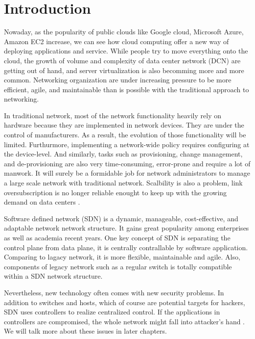\chapter{Introduction}
\label{chap:intro}
\setcounter{page}{1}

Nowaday, as the popularity of public clouds like Google cloud, Microsoft Azure, Amazon EC2 increase, we can see how cloud computing offer a new way of deploying applications and service. While people try to move everything onto the cloud, the growth of volume and complexity of data center network (DCN) are getting out of hand, and server virtualization is also becomming more and more common. Networking organization are under increasing pressure to be more efficient, agile, and maintainable than is possible with the traditional approach to networking.

In traditional network, most of the network functionality heavily rely on hardware because they are implemented in network devices. They are under the control of manufacturers. As a result, the evolution of those functionality will be limited. Furthurmore, implementing a network-wide policy requires configuring at the device-level. And similarly, tasks such as provisioning, change management, and de-provisioning are also very time-consuming, error-prone and require a lot of manwork. It will surely be a formidable job for network administrators to manage a large scale network with traditional network. Scalbility is also a problem, link oversubscription is no longer reliable enought to keep up with the growing demand on data centers \cite{TTN}.

Software defined network (SDN) is a dynamic, manageable, cost-effective, and adaptable network network structure. It gains great popularity among enterprises as well as academia recent years. One key concept of SDN is separating the control plane from data plane, it is centrally contrallable by software application. Comparing to lagacy network, it is more flexible, maintainable and agile. Also, components of legacy network such as a regular switch is totally compatible within a SDN network structure.

Nevertheless, new technology often comes with new security problems. In addition to switches and hosts, which of course are potential targets for hackers, SDN uses controllers to realize centralized control. If the applications in controllers are compromised, the whole network might fall into attacker's hand \cite{TSA}. We will talk more about these issues in later chapters.

